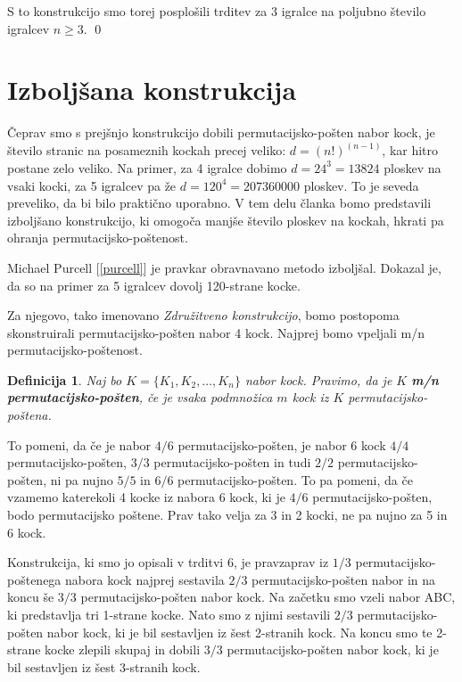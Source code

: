 \documentclass[a4paper, 12pt]{article}
\newtheorem{definicija}{Definicija}
\begin{document}
S to konstrukcijo smo torej posplošili trditev za 3 igralce na poljubno število igralcev $n \geq 3$.
\qed

\section{Izboljšana konstrukcija}

Čeprav smo s prejšnjo konstrukcijo dobili permutacijsko-pošten nabor kock, je število stranic na posameznih kockah precej veliko: $d = (n!)^{(n-1)}$, kar hitro postane zelo veliko. Na primer, za 4 igralce dobimo $d = 24^3 = 13824$ ploskev na vsaki kocki, za 5 igralcev pa že $d = 120^4 = 207360000$ ploskev. To je seveda preveliko, da bi bilo praktično uporabno.
V tem delu članka bomo predstavili izboljšano konstrukcijo, ki omogoča manjše število ploskev na kockah, hkrati pa ohranja permutacijsko-poštenost.

Michael Purcell [\ref{purcell}] je pravkar obravnavano metodo izboljšal. Dokazal je, da so na primer za 5 igralcev dovolj 120-strane kocke.

Za njegovo, tako imenovano {\em Združitveno konstrukcijo}, bomo postopoma skonstruirali permutacijsko-pošten nabor 4 kock. Najprej bomo vpeljali m/n permuta\-cijsko-poštenost.

\begin{definicija} Naj bo $K = \{K_1, K_2, \ldots, K_n\}$ nabor kock. Pravimo, da je $K$ \textbf{m/n permutacijsko-pošten}, če je vsaka podmnožica $m$ kock iz $K$ permutacijsko-poštena.
\end{definicija}

To pomeni, da če je nabor $4/6$ permutacijsko-pošten, je nabor 6 kock $4/4$ permutacijsko-pošten, $3/3$ permutacijsko-pošten in tudi $2/2$ permutacijsko-pošten, ni pa nujno $5/5$ in $6/6$ permutacijsko-pošten. To pa pomeni, da če vzamemo katerekoli 4 kocke iz nabora 6 kock, ki je $4/6$ permutacijsko-pošten, bodo permutacijsko poštene. Prav tako velja za 3 in 2 kocki, ne pa nujno za 5 in 6 kock.

Konstrukcija, ki smo jo opisali v trditvi 6, je pravzaprav iz $1/3$ permutacijsko-poštenega nabora kock najprej sestavila $2/3$ permutacijsko-pošten nabor in na koncu še $3/3$ permuta\-cijsko-pošten nabor kock. Na začetku smo vzeli nabor ABC, ki predstavlja tri 1-strane kocke. Nato smo z njimi sestavili $2/3$ permutacijsko-pošten nabor kock, ki je bil sestavljen iz šest 2-stranih kock. Na koncu smo te 2-strane kocke zlepili skupaj in dobili $3/3$ permutacijsko-pošten nabor kock, ki je bil sestavljen iz šest 3-stranih kock.
\end{document}
